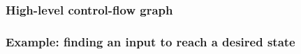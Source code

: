 \documentclass[11pt,table]{beamer}
\begin{document}
  \begin{frame}
    \frametitle{High-level control-flow graph}
    \vspace{-.75cm}\centering
  \end{frame}
  
  
  


\begin{frame}
\frametitle{Example: finding an input to reach a desired state}
  \vspace{-.75cm}\centering
\end{frame}
\end{document}
